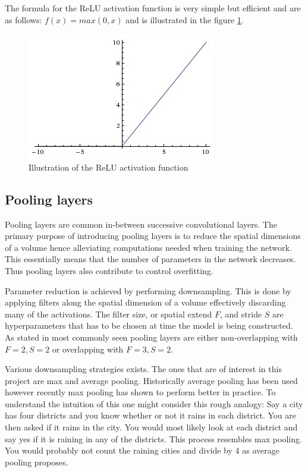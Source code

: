 The formula for the ReLU activation function is very simple but efficient and
are as follows: $f(x)=max(0,x)$ and is illustrated in the figure \ref{fig:relu}.

\begin{figure}
  \centering
  \includegraphics[scale=0.5]{Img/relu.jpeg}
  \caption{Illustration of the ReLU activation function}
  \label{fig:relu}
\end{figure}


\subsection{Pooling layers} %
\label{sub:pool_layers}

Pooling layers are common in-between successive convolutional layers. The
primary purpose of introducing pooling layers is to reduce the spatial
dimensions of a volume hence alleviating computations needed when training the
network. This essentially means that the number of parameters in the network
decreases. Thus pooling layers also contribute to control overfitting.

Parameter reduction is achieved by performing downsampling. This is done by
applying filters along the spatial dimension of a volume effectively discarding
many of the activations. The filter size, or spatial extend $F$, and stride $S$
are hyperparameters that has to be chosen at time the model is being
constructed. As stated in \cite{cs231n} most commonly seen pooling layers are
either non-overlapping with $F=2, S=2$ or overlapping with $F=3, S=2$.

Various downsampling strategies exists. The ones that are of interest in this
project are max and average pooling. Historically average pooling has been used
however recently max pooling has shown to perform better in
practice\cite{cs231n}. To understand the intuition of this one might consider this rough analogy: Say a
city has four districts and you know whether or not it rains in each district.
You are then asked if it rains in the city. You would most likely look at each
district and say yes if it is raining in any of the districts. This process
resembles max pooling. You would probably not count the raining cities and
divide by 4 as average pooling proposes.

